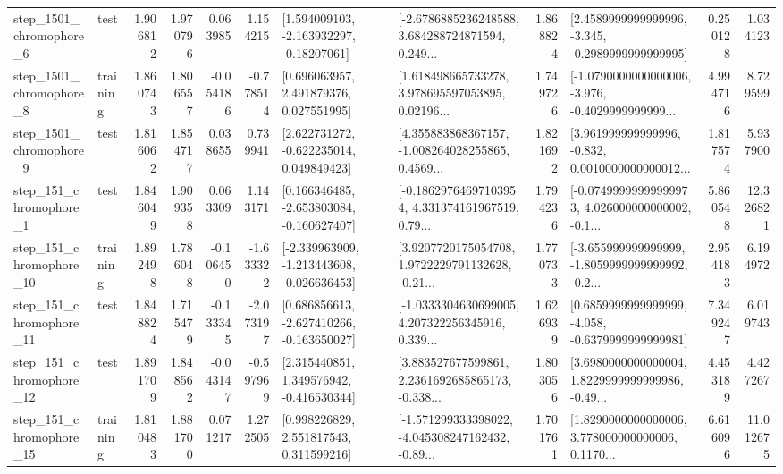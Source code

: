 \begin{tabular}{llrrrrllrlrr}
  step\_1501\_chromophore\_6 &      test &      1.906812 &    1.970796 &      0.063985 &  1.154215 &    [1.594009103, -2.163932297, -0.18207061] &  [-2.6786885236248588, 3.684288724871594, 0.249... &       1.868824 &  [2.4589999999999996, -3.345, -0.2989999999999995] &            0.250128 &          1.034123 \\
  step\_1501\_chromophore\_8 &  training &      1.860743 &    1.806557 &     -0.054186 & -0.778514 &     [0.696063957, 2.491879376, 0.027551995] &  [1.618498665733278, 3.978695597053895, 0.02196... &       1.749726 &  [-1.0790000000000006, -3.976, -0.4029999999999... &            4.994716 &          8.729599 \\
  step\_1501\_chromophore\_9 &      test &      1.816062 &    1.854717 &      0.038655 &  0.739941 &    [2.622731272, -0.622235014, 0.049849423] &  [4.355883868367157, -1.008264028255865, 0.4569... &       1.821692 &  [3.961999999999996, -0.832, 0.0010000000000012... &            1.817574 &          5.937900 \\
   step\_151\_chromophore\_1 &      test &      1.846049 &    1.909358 &      0.063309 &  1.143171 &   [0.166346485, -2.653803084, -0.160627407] &  [-0.18629764697103954, 4.331374161967519, 0.79... &       1.794236 &  [-0.07499999999999973, 4.026000000000002, -0.1... &            5.860548 &         12.326821 \\
  step\_151\_chromophore\_10 &  training &      1.892498 &    1.786048 &     -0.106450 & -1.633322 &  [-2.339963909, -1.213443608, -0.026636453] &  [3.9207720175054708, 1.9722229791132628, -0.21... &       1.770733 &  [-3.655999999999999, -1.8059999999999992, -0.2... &            2.954183 &          6.194972 \\
  step\_151\_chromophore\_11 &      test &      1.848824 &    1.715479 &     -0.133345 & -2.073197 &   [0.686856613, -2.627410266, -0.163650027] &  [-1.0333304630699005, 4.207322256345916, 0.339... &       1.626939 &  [0.6859999999999999, -4.058, -0.6379999999999981] &            7.349247 &          6.019743 \\
  step\_151\_chromophore\_12 &      test &      1.891709 &    1.848562 &     -0.043147 & -0.597969 &    [2.315440851, 1.349576942, -0.416530344] &  [3.883527677599861, 2.2361692685865173, -0.338... &       1.803056 &  [3.6980000000000004, 1.8229999999999986, -0.49... &            4.453189 &          4.427267 \\
  step\_151\_chromophore\_15 &  training &      1.810483 &    1.881700 &      0.071217 &  1.272505 &     [0.998226829, 2.551817543, 0.311599216] &  [-1.571299333398022, -4.045308247162432, -0.89... &       1.701761 &  [1.8290000000000006, 3.778000000000006, 0.1170... &            6.616096 &         11.012675 \\

\end{tabular}
